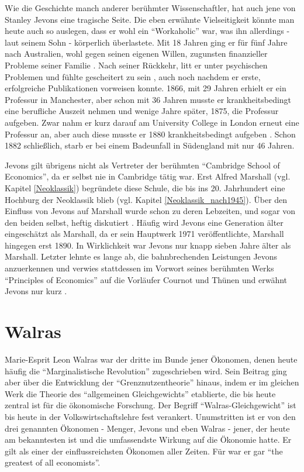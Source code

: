 Wie die Geschichte manch anderer berühmter Wissenschaftler, hat auch jene von Stanley Jevons eine tragische Seite. Die eben erwähnte Vielseitigkeit könnte man heute auch so auslegen, dass er wohl ein "`Workaholic"' war, was ihn allerdings - laut seinem Sohn \parencite[S. 230]{Jevons1934} - körperlich überlastete. Mit 18 Jahren ging er für fünf Jahre nach Australien, wohl gegen seinen eigenen Willen, zugunsten finanzieller Probleme seiner Familie \parencite[S. 518]{Keynes1936a}. Nach seiner Rückkehr, litt er unter psychischen Problemen und fühlte gescheitert zu sein \parencite[S. 527]{Keynes1936a}, auch noch nachdem er erste, erfolgreiche Publikationen vorweisen konnte.  1866, mit 29 Jahren erhielt er ein Professur in Manchester, aber schon mit 36 Jahren musste er krankheitsbedingt eine berufliche Auszeit nehmen und wenige Jahre später, 1875, die Professur aufgeben. Zwar nahm er kurz darauf am University College in London erneut eine Professur an, aber auch diese musste er 1880 krankheitsbedingt aufgeben \parencite[S. 230]{Jevons1934}. Schon 1882 schließlich, starb er bei einem Badeunfall in Südengland mit nur 46 Jahren.

Jevons gilt übrigens nicht als Vertreter der berühmten "`Cambridge School of Economics"', da er selbst nie in Cambridge tätig war. Erst Alfred Marshall (vgl. Kapitel \ref{Neoklassik}) begründete diese Schule, die bis ins 20. Jahrhundert eine Hochburg der Neoklassik blieb (vgl. Kapitel \ref{Neoklassik_nach1945}). Über den Einfluss von Jevons auf Marshall wurde schon zu deren Lebzeiten, und sogar von den beiden selbst, heftig diskutiert \parencite[S. 536]{Keynes1936a}. Häufig wird Jevons eine Generation älter eingeschätzt als Marshall, da er sein Hauptwerk 1971 veröffentlichte, Marshall hingegen erst 1890. In Wirklichkeit war Jevons nur knapp sieben Jahre älter als Marshall. Letzter lehnte es lange ab, die bahnbrechenden Leistungen Jevons anzuerkennen \parencite[S. 535]{Keynes1936a} und verwies stattdessen im Vorwort seines berühmten Werks "`Principles of Economics"' auf die Vorläufer Cournot und Thünen und erwähnt Jevons nur kurz \parencite[S. XXII]{Marshall1890}. 


\section{Walras}
\label{Walras}

Marie-Esprit Leon Walras war der dritte im Bunde jener Ökonomen, denen heute häufig die "`Marginalistische Revolution"' zugeschrieben wird. Sein Beitrag ging aber über die Entwicklung der "`Grenznutzentheorie"' hinaus, indem er im gleichen Werk die Theorie des "`allgemeinen Gleichgewichts"' etablierte, die bis heute zentral ist für die ökonomische Forschung. Der Begriff "`Walras-Gleichgewicht"' ist bis heute in der Volkswirtschaftslehre fest verankert. Unumstritten ist er von den drei genannten Ökonomen - Menger, Jevons und eben Walras - jener, der heute am bekanntesten ist und die umfassendste Wirkung auf die Ökonomie hatte. Er gilt als einer der einflussreichsten Ökonomen aller Zeiten. Für \textcite[S. 826]{Schumpeter1954} war er gar "`the greatest of all economists"'. 

